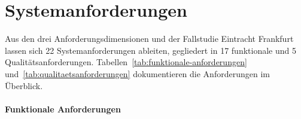 \section{Systemanforderungen}\label{zusammenfassung-der-systemanforderungen}

Aus den drei Anforderungsdimensionen und der Fallstudie Eintracht Frankfurt lassen sich 22 Systemanforderungen ableiten, gegliedert in 17 funktionale und 5 Qualitätsanforderungen. Tabellen~\ref{tab:funktionale-anforderungen} und~\ref{tab:qualitaetsanforderungen} dokumentieren die Anforderungen im Überblick.

\paragraph{Funktionale Anforderungen}\label{funktionale-anforderungen}

